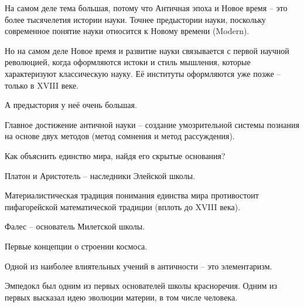 \documentclass[main.tex]{subfiles}
\begin{document}


На самом деле тема большая, потому что Античная эпоха и Новое время -- это более тысячелетия истории науки.
Точнее предыстории науки, поскольку современное понятие науки относится к Новому времени (Modern).

Но на самом деле Новое время и развитие науки связывается с первой научной революцией, когда оформляются истоки и стиль мышления, которые характеризуют классическую науку.
Её институты оформляются уже позже -- только в XVIII веке.

А предыстория у неё очень большая.





Главное достижение античной науки -- создание умозрительной системы познания на основе двух методов (метод сомнения и метод рассуждения).



Как объяснить единство мира, найдя его скрытые основания?

Платон и Аристотель -- наследники Элейской школы.

Материалистическая традиция понимания единства мира противостоит пифагорейской математической традиции (вплоть до XVIII века).

Фалес -- основатель Милетской школы.





Первые концепции о строении космоса.

Одной из наиболее влиятельных учений в античности -- это элементаризм.

Эмпедокл был одним из первых основателей школы красноречия.
Одним из первых высказал идею эволюции материи, в том числе человека.
\end{document}
